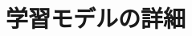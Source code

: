 ﻿\documentclass[../main]{subfiles}
\begin{document}
\chapter{学習モデルの詳細}
\thispagestyle{empty}
\newpage
\end{document}
